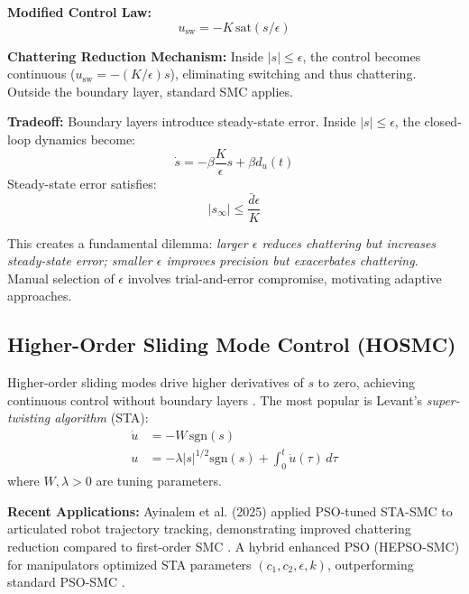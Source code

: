 \textbf{Modified Control Law:}
\begin{equation}
u_{\text{sw}} = -K \, \text{sat}(s/\epsilon)
\label{eq:boundary_layer_control}
\end{equation}

\textbf{Chattering Reduction Mechanism:} Inside $|s| \leq \epsilon$, the control becomes continuous ($u_{\text{sw}} = -(K/\epsilon) s$), eliminating switching and thus chattering. Outside the boundary layer, standard SMC applies.

\textbf{Tradeoff:} Boundary layers introduce steady-state error. Inside $|s| \leq \epsilon$, the closed-loop dynamics become:
\begin{equation}
\dot{s} = -\beta \frac{K}{\epsilon} s + \beta d_u(t)
\label{eq:boundary_layer_dynamics}
\end{equation}
Steady-state error satisfies:
\begin{equation}
|s_{\infty}| \leq \frac{\bar{d} \epsilon}{K}
\label{eq:steady_state_error}
\end{equation}

This creates a fundamental dilemma: \emph{larger $\epsilon$ reduces chattering but increases steady-state error; smaller $\epsilon$ improves precision but exacerbates chattering}. Manual selection of $\epsilon$ involves trial-and-error compromise, motivating adaptive approaches.

\subsection{Higher-Order Sliding Mode Control (HOSMC)}

Higher-order sliding modes drive higher derivatives of $s$ to zero, achieving continuous control without boundary layers \cite{levant2003higher,shtessel2014sliding}. The most popular is Levant's \emph{super-twisting algorithm} (STA):
\begin{align}
\dot{u} &= -W \, \text{sgn}(s) \label{eq:sta_control_derivative} \\
u &= -\lambda |s|^{1/2} \text{sgn}(s) + \int_{0}^{t} \dot{u}(\tau) \, d\tau \label{eq:sta_control}
\end{align}
where $W, \lambda > 0$ are tuning parameters.

\textbf{Recent Applications:} Ayinalem et al. (2025) applied PSO-tuned STA-SMC to articulated robot trajectory tracking, demonstrating improved chattering reduction compared to first-order SMC \cite{ayinalem2025pso}. A hybrid enhanced PSO (HEPSO-SMC) for manipulators optimized STA parameters $(c_1, c_2, \epsilon, k)$, outperforming standard PSO-SMC \cite{hepso2025manipulator}.

